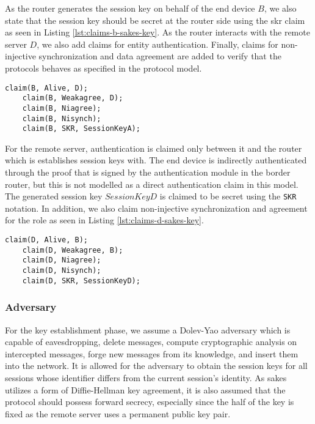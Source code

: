 As the router generates the session key on behalf of the end device $B$, we also state that the session key should be secret at the router side using the \gls{skr} claim as seen in Listing \ref{lst:claims-b-sakes-key}. As the router interacts with the remote server $D$, we also add claims for entity authentication. Finally, claims for non-injective synchronization and data agreement are added to verify that the protocols behaves as specified in the protocol model. \\

\begin{lstlisting}[caption={Security claims for role B during key establishment in SAKES.}, label={lst:claims-b-sakes-key}]
	claim(B, Alive, D);
	claim(B, Weakagree, D);
	claim(B, Niagree);
	claim(B, Nisynch);
	claim(B, SKR, SessionKeyA);
\end{lstlisting}


For the remote server, authentication is claimed only between it and the router which is establishes session keys with. The end device is indirectly authenticated through the proof that is signed by the authentication module in the border router, but this is not modelled as a direct authentication claim in this model. The generated session key $SessionKeyD$ is claimed to be secret using the \texttt{SKR} notation. In addition, we also claim non-injective synchronization and agreement for the role as seen in Listing \ref{lst:claims-d-sakes-key}.\\


\begin{lstlisting}[caption={Security claims for role D during key establishment in SAKES.}, label={lst:claims-d-sakes-key}]
	claim(D, Alive, B);
	claim(D, Weakagree, B);
	claim(D, Niagree);
	claim(D, Nisynch);
	claim(D, SKR, SessionKeyD);
\end{lstlisting}

\subsubsection{Adversary}

For the key establishment phase, we assume a Dolev-Yao adversary which is capable of eavesdropping, delete messages, compute cryptographic analysis on intercepted messages, forge new messages from its knowledge, and insert them into the network. It is allowed for the adversary to obtain the session keys for all sessions whose identifier differs from the current session's identity. As \gls{sakes} utilizes a form of Diffie-Hellman key agreement, it is also assumed that the protocol should possess forward secrecy, especially since the half of the key is fixed as the remote server uses a permanent public key pair.

